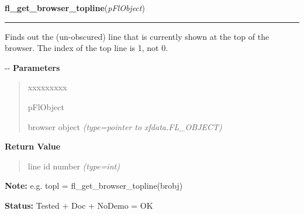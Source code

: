 \hspace{.8\funcindent}\begin{boxedminipage}{\funcwidth}

    \raggedright \textbf{fl\_get\_browser\_topline}(\textit{pFlObject})

    \vspace{-1.5ex}

    \rule{\textwidth}{0.5\fboxrule}
\setlength{\parskip}{2ex}

Finds out the (un-obscured) line that is currently shown at the top
of the browser. The index of the top line is 1, not 0.

-{}-
\setlength{\parskip}{1ex}
      \textbf{Parameters}
      \vspace{-1ex}

      \begin{quote}
        \begin{Ventry}{xxxxxxxxx}

          \item[pFlObject]


browser object
            {\it (type=pointer to xfdata.FL\_OBJECT)}

        \end{Ventry}

      \end{quote}

      \textbf{Return Value}
    \vspace{-1ex}

      \begin{quote}

line id number
      {\it (type=int)}

      \end{quote}

\textbf{Note:} 
e.g. topl = fl\_get\_browser\_topline(brobj)


\textbf{Status:} 
Tested + Doc + NoDemo = OK


    \end{boxedminipage}

    \label{xformslib:flbrowser:fl_get_browser}

    \vspace{0.5ex}

